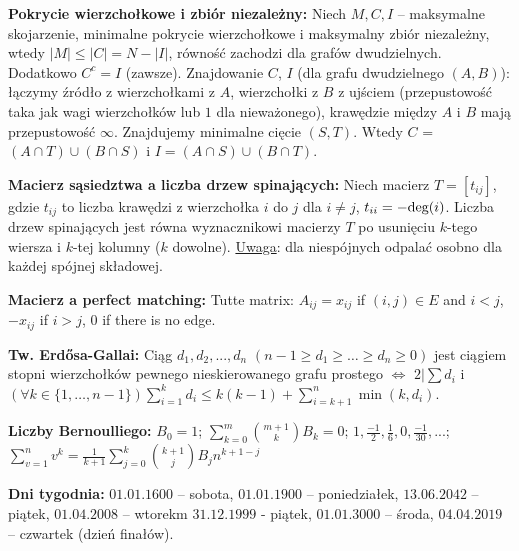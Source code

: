 \noindent
\textbf{Pokrycie wierzchołkowe i zbiór niezależny:} Niech $M, C, I$ -- maksymalne skojarzenie, minimalne pokrycie wierzchołkowe i maksymalny zbiór niezależny, wtedy $|M| \le |C| = N - |I|$, równość zachodzi dla grafów dwudzielnych. Dodatkowo $C^c = I$ (zawsze). Znajdowanie $C$, $I$ (dla grafu dwudzielnego $(A, B)$): łączymy źródło z wierzchołkami z $A$, wierzchołki z $B$ z ujściem (przepustowość taka jak wagi wierzchołków lub $1$ dla nieważonego), krawędzie między $A$ i $B$ mają przepustowość $\infty$. Znajdujemy minimalne cięcie $(S, T)$. Wtedy $C$ = $(A \cap T) \cup (B \cap S)$ i $I = (A \cap S) \cup (B \cap T).$

\noindent
\textbf{Macierz sąsiedztwa a liczba drzew spinających:} Niech macierz $T = [t_{ij}]$, gdzie $t_{ij}$ to liczba krawędzi z wierzchołka $i$ do $j$ dla $i \neq j$, $t_{ii} = -\hbox{deg}(i)$. Liczba drzew spinających jest równa wyznacznikowi macierzy $T$ po usunięciu $k$-tego wiersza i $k$-tej kolumny ($k$ dowolne). \underline{Uwaga}: dla niespójnych odpalać osobno dla każdej spójnej składowej.

\noindent
\textbf{Macierz a perfect matching:} Tutte matrix: $A_{ij} = x_{ij}$ if $(i, j) \in E$ and $i < j$, $-x_{ij}$ if $i > j$, $0$ if there is no edge.

\noindent
\textbf{Tw. Erdősa-Gallai:} Ciąg $d_1, d_2, ..., d_n$ $(n - 1 \ge d_1 \ge \dots \ge d_n \ge 0)$ jest ciągiem stopni wierzchołków pewnego nieskierowanego grafu prostego $\iff$ $2 | \sum d_i$ i $(\forall k \in \{1, \dots, n-1\}) \sum_{i = 1}^k d_i \le k(k-1) + \sum_{i=k+1}^n \min(k, d_i).$

\noindent
\textbf{Liczby Bernoulliego:} $B_0 = 1$; $\sum_{k = 0}^{m} \binom{m + 1}{k} B_k = 0$; $1, \frac{-1}{2}, \frac{1}{6}, 0, \frac{-1}{30}, ...$; $\sum_{v = 1}^{n} v^k = \frac{1}{k + 1} \sum_{j = 0}^{k} \binom{k + 1}{j} B_j n^{k + 1 - j}$

\noindent
\textbf{Dni tygodnia:} $01.01.1600$ -- sobota, $01.01.1900$ -- poniedziałek, $13.06.2042$ -- piątek, $01.04.2008$ -- wtorekm $31.12.1999$ - piątek, $01.01.3000$ -- środa, $04.04.2019$ -- czwartek (dzień finałów).